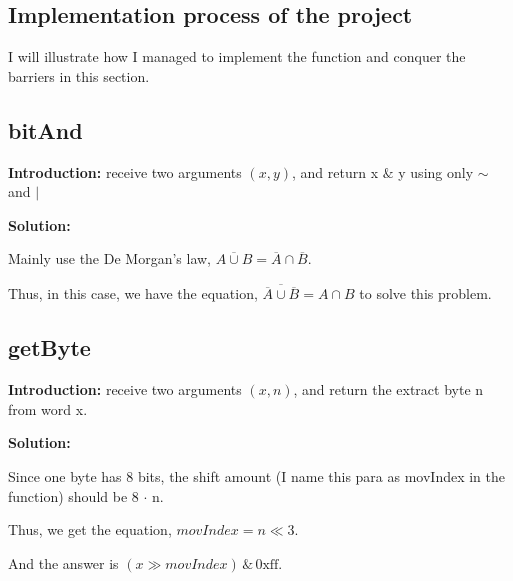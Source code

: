 \documentclass[12pt,a4paper]{article}
\theoremstyle{definition}
\numberwithin{equation}{section}
\numberwithin{figure}{section}
\begin{document}
\begin{spacing}{1.5}
\section{Implementation process of the project}
I will illustrate how I managed to implement the function and conquer the barriers in this section.

\subsection{bitAnd}
\textbf{Introduction: }receive two arguments $\left(x, y\right)$, and return x $\&$ y using only $\sim$ and $\mid$\par
\textbf{Solution: }\par
Mainly use the De Morgan's law, $\overline{A \cup B} = \overline{A} \cap \overline{B}$.\par
Thus, in this case, we have the equation, $\overline{\overline{A} \cup \overline{B}} = A \cap B$ to solve this problem.\par

\subsection{getByte}
\textbf{Introduction: }receive two arguments $\left(x, n\right)$, and return the extract byte n from word x.\par
\textbf{Solution: }\par
Since one byte has 8 bits, the shift amount (I name this para as movIndex in the function) should be 8 $\cdot$ n.\par
Thus, we get the equation, $movIndex = n \ll 3$.\par
And the answer is $\left(x \gg movIndex\right)\,\&\,\textrm{0xff}$.\par


\end{spacing}
\end{document}
